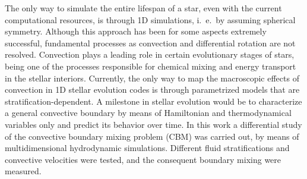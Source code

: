 The only way to simulate the entire lifespan of a star, even with the current computational resources, is through 1D simulations, i.\ e.\ by assuming spherical symmetry. Although this approach has been for some aspects extremely successful, fundamental processes as convection and differential rotation are not resolved. Convection plays a leading role in certain evolutionary stages of stars, being one of the processes responsible for chemical mixing and energy transport in the stellar interiors. Currently, the only way to map the macroscopic effects of convection in 1D stellar evolution codes is through parametrized models that are stratification-dependent. A milestone in stellar evolution would be to characterize a general convective boundary by means of Hamiltonian and thermodynamical variables only and predict its behavior over time. In this work a differential study of the convective boundary mixing problem (CBM) was carried out, by means of multidimensional hydrodynamic simulations. Different fluid stratifications and convective velocities were tested, and the consequent boundary mixing were measured.

